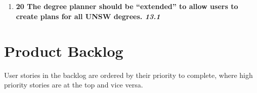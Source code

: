 \documentclass[12pt,titlepage]{article}
\newenvironment{storyPoint}
   {\color{blue} \bfseries}
   {}
\newenvironment{storyId}
   {\color{Bittersweet} \itshape}
   {}
\newenvironment{optionalStory}
   {\color[rgb]{0.015625,0.2890625,0.046875}}
   {}
\begin{document}
\subsection{\epicThirteen{}}

\newcommand{\storyThirteenPointOne}{
   \begin{storyPoint}20\end{storyPoint}
   \begin{optionalStory}
   The degree planner should be “extended” to allow users to create plans for
   all UNSW degrees.
   \end{optionalStory}
   \begin{storyId}13.1\end{storyId}
}

\begin{enumerate}
   \item \storyThirteenPointOne{}
\end{enumerate}

\section{Product Backlog}

User stories in the backlog are ordered by their priority to complete, where
high priority stories are at the top and vice versa.
\end{document}
